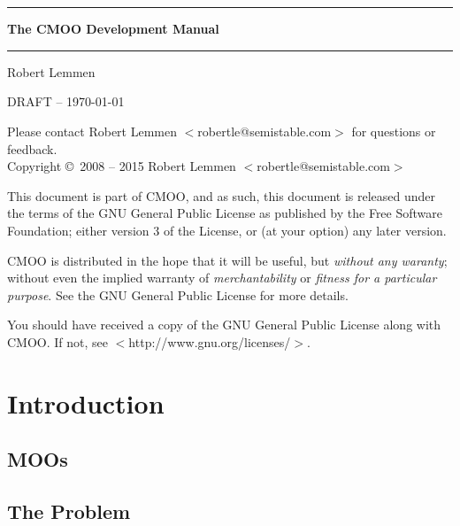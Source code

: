 \documentclass[12pt,a4paper]{article}
\begin{document}
\thispagestyle{empty}
~\\~\vspace{3cm}
\begin{center}
\rule{\textwidth}{1.5pt}\vspace{8mm}
{\Huge\bf The CMOO Development Manual}\vspace{4mm}
\rule{\textwidth}{1.5pt}\vspace{10mm}
{\large Robert Lemmen}
\end{center}
\clearpage

\thispagestyle{empty}
DRAFT -- \today

Please contact Robert Lemmen $<$robertle@semistable.com$>$ for questions or
feedback.
\\
Copyright \copyright~2008 -- 2015 Robert Lemmen $<$robertle@semistable.com$>$

This document is part of CMOO, and as such, this document is released under the terms of the GNU General Public License as published by the Free Software Foundation; either version 3 of the License, or (at your option) any later version.

CMOO is distributed in the hope that it will be useful, but {\em without any
waranty}; without even the implied warranty of {\em merchantability} or {\em
fitness for a particular purpose}.  See the GNU General Public License for more details.

You should have received a copy of the GNU General Public License along with CMOO. If not, see $<$http://www.gnu.org/licenses/$>$.
\cleardoublepage

\tableofcontents
\cleardoublepage

\section{Introduction}\label{sec:introduction}

\subsection{MOOs}


\subsection{The Problem}
\end{document}
